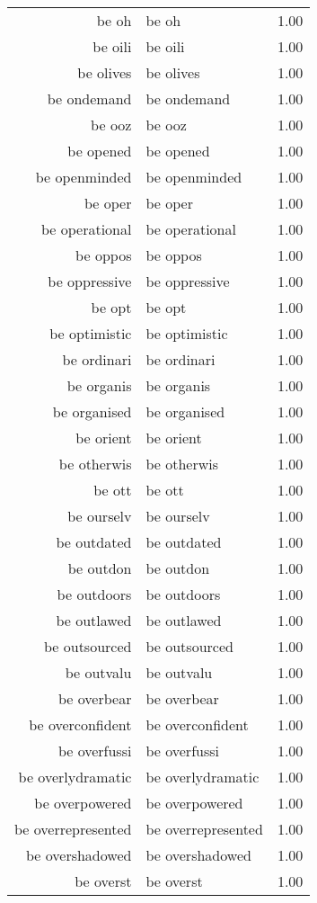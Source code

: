 \begin{table}[ht]
\begin{tabular}{rlr}
  be oh & be oh & 1.00 \\ 
  be oili & be oili & 1.00 \\ 
  be olives & be olives & 1.00 \\ 
  be ondemand & be ondemand & 1.00 \\ 
  be ooz & be ooz & 1.00 \\ 
  be opened & be opened & 1.00 \\ 
  be openminded & be openminded & 1.00 \\ 
  be oper & be oper & 1.00 \\ 
  be operational & be operational & 1.00 \\ 
  be oppos & be oppos & 1.00 \\ 
  be oppressive & be oppressive & 1.00 \\ 
  be opt & be opt & 1.00 \\ 
  be optimistic & be optimistic & 1.00 \\ 
  be ordinari & be ordinari & 1.00 \\ 
  be organis & be organis & 1.00 \\ 
  be organised & be organised & 1.00 \\ 
  be orient & be orient & 1.00 \\ 
  be otherwis & be otherwis & 1.00 \\ 
  be ott & be ott & 1.00 \\ 
  be ourselv & be ourselv & 1.00 \\ 
  be outdated & be outdated & 1.00 \\ 
  be outdon & be outdon & 1.00 \\ 
  be outdoors & be outdoors & 1.00 \\ 
  be outlawed & be outlawed & 1.00 \\ 
  be outsourced & be outsourced & 1.00 \\ 
  be outvalu & be outvalu & 1.00 \\ 
  be overbear & be overbear & 1.00 \\ 
  be overconfident & be overconfident & 1.00 \\ 
  be overfussi & be overfussi & 1.00 \\ 
  be overlydramatic & be overlydramatic & 1.00 \\ 
  be overpowered & be overpowered & 1.00 \\ 
  be overrepresented & be overrepresented & 1.00 \\ 
  be overshadowed & be overshadowed & 1.00 \\ 
  be overst & be overst & 1.00 \\ 

\end{tabular}
\end{table}
